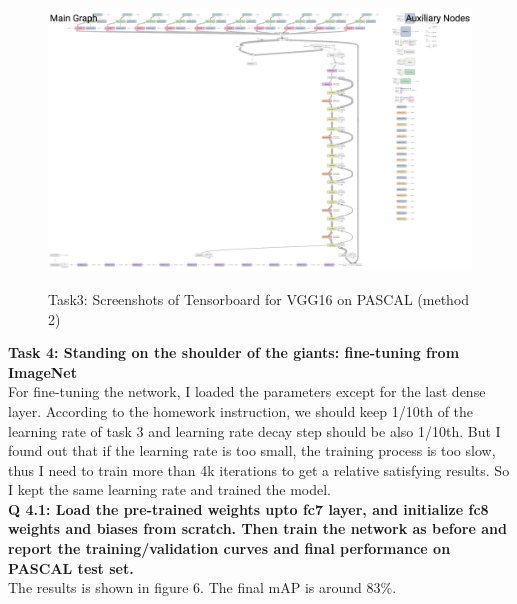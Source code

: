 \documentclass[12pt]{report}
\begin{document}
\begin{outline}
\begin{figure}[!h]
{    \includegraphics[width=5.5in]{task3_graph_2.png}}
  \caption{Task3: Screenshots of Tensorboard for VGG16 on PASCAL (method 2)}
\label{fig:short}
\end{figure}

\item \textbf{Task 4: Standing on the shoulder of the giants: fine-tuning from ImageNet}\\

For fine-tuning the network, I loaded the parameters except for the last dense layer. According to the homework instruction, we should keep 1/10th of the learning rate of task 3 and learning rate decay step should be also 1/10th. But I found out that if the learning rate is too small, the training process is too slow, thus I need to train more than 4k iterations to get a relative satisfying results. So I kept the same learning rate and trained the model. \\

\textbf{Q 4.1: Load the pre-trained weights upto fc7 layer, and initialize fc8 weights and biases from scratch. Then train the network as before and report the training/validation curves and final performance on PASCAL test set.}\\

The results is shown in figure 6. The final mAP is around 83\%.\\


\end{outline}
\end{document}

